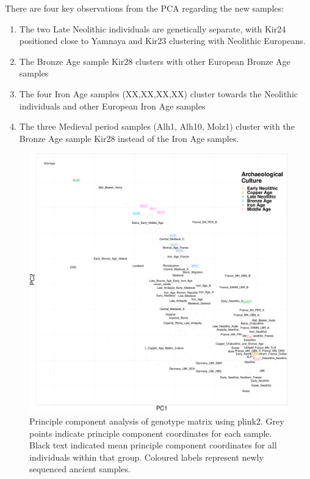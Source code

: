 There are four key observations from the PCA regarding the new samples:

\begin{enumerate}
\item The two Late Neolithic individuals are genetically separate, with Kir24 positioned close to Yamnaya and Kir23 clustering with Neolithic Europeans.
\item The Bronze Age sample Kir28 clusters with other European Bronze Age samples
\item The four Iron Age samples (XX,XX,XX,XX) cluster towards the Neolithic individuals and other European Iron Age samples
\item The three Medieval period samples (Alh1, Alh10, Molz1) cluster with the Bronze Age sample Kir28 instead of the Iron Age samples.
\end{enumerate}

\begin{figure}[htp]
    \centering
    \includegraphics[width=1.0\textwidth]{../images/chapter4/plink_PCA.pdf}
    \caption{Principle component analysis of genotype matrix using plink2. Grey points indicate principle component coordinates for each sample. Black text indicated mean principle component coordinates for all individuals within that group. Coloured labels represent newly sequenced ancient samples.}
    \label{fig:plink_PCA}
\end{figure}

